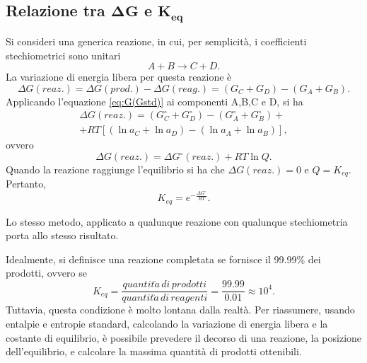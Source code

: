 \subsection{Relazione tra \texorpdfstring{$\bm{\Delta G}$}{G} e \texorpdfstring{$\bm{K_{eq}}$}{K}}
Si consideri una generica reazione, in cui, per semplicità, i coefficienti stechiometrici sono unitari
\begin{equation}
    A+B\to C+D.
\end{equation}
La variazione di energia libera per questa reazione è
\begin{equation}
    \Delta G(reaz.)=\Delta G(prod.)-\Delta G(reag.)=(G_C+G_D)-(G_A+G_B).
\end{equation}
Applicando l'equazione \eqref{eq:G(Gstd)} ai componenti A,B,C e D, si ha
\begin{multline}
    \Delta G(reaz.)=(G_C^\circ+G_D^\circ)-(G_A^\circ+G_B^\circ)+ \\
    +RT[(\ln{a_C}+\ln{a_D})-(\ln{a_A}+\ln{a_B})],
\end{multline}
ovvero
\begin{equation}
    \Delta G(reaz.)=\Delta G^\circ(reaz.)+RT\ln{Q}.
\end{equation}
Quando la reazione raggiunge l'equilibrio si ha che $\Delta G(reaz.)=0$ e $Q=K_{eq}$. Pertanto,
\begin{equation}
    K_{eq}=e^{-\frac{\Delta G^\circ}{RT}}.
\end{equation}
\begin{obs}
    Lo stesso metodo, applicato a qualunque reazione con qualunque stechiometria porta allo stesso risultato.
\end{obs}
Idealmente, si definisce una reazione completata se fornisce il 99.99\% dei prodotti, ovvero se
\begin{equation}\label{eq:reaz.compl.}
    K_{eq}=\frac{quantit\grave{a}\,di\,prodotti}{quantit\grave{a}\,di\, reagenti}=\frac{99.99}{0.01}\approx10^4.
\end{equation}
Tuttavia, questa condizione è molto lontana dalla realtà. Per riassumere, usando entalpie e entropie standard, calcolando la variazione di energia libera e la costante di equilibrio, è possibile prevedere il decorso di una reazione, la posizione dell'equilibrio, e calcolare la massima quantità di prodotti ottenibili.

